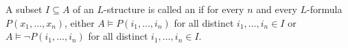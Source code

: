A subset $I \subseteq A$ of an $L$-structure is called an  if for every $n$ and every $L$-formula $P(x_1, \ldots, x_n)$, either $A \vDash P(i_1, \ldots, i_n)$ for all distinct $i_1, \ldots, i_n \in I$ or $A \vDash \neg P(i_1, \ldots, i_n)$ for all distinct $i_1, \ldots, i_n \in I$.
